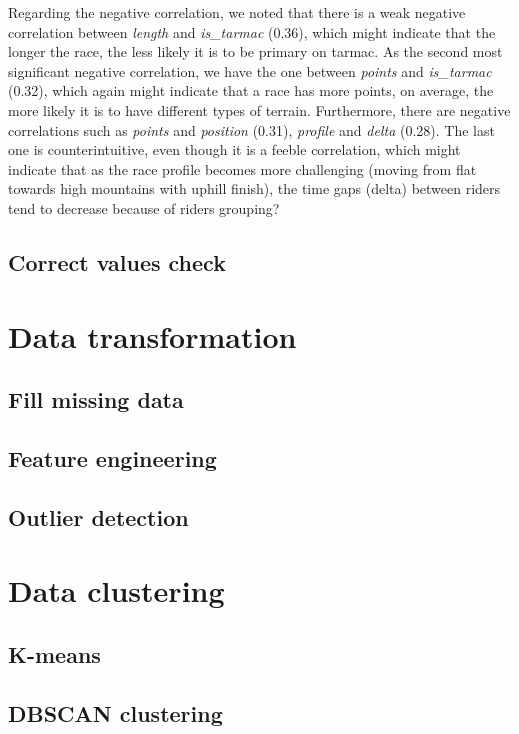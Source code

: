 \documentclass[a4paper, twoside,openright]{report}
\begin{document}
Regarding the negative correlation, we noted that there is a weak negative correlation between \textit{length} and \textit{is\_tarmac} (0.36), which might indicate that the longer the race, the less likely it is to be primary on tarmac.  As the second most significant negative correlation, we have the one between \textit{points} and \textit{is\_tarmac} (0.32), which again might indicate that a race has more points, on average, the more likely it is to have different types of terrain. Furthermore, there are negative correlations such as \textit{points} and \textit{position} (0.31), \textit{profile} and \textit{delta} (0.28). The last one is counterintuitive, even though it is a feeble correlation, which might indicate that as the race profile becomes more challenging (moving from flat towards high mountains with uphill finish), the time gaps (delta) between riders tend to decrease because of riders grouping?

\subsection{Correct values check}

\section{Data transformation}

\subsection{Fill missing data}

\subsection{Feature engineering}

\subsection{Outlier detection}

\section{Data clustering}

\subsection{K-means}

\subsection{DBSCAN clustering}
\end{document}
